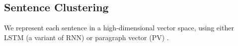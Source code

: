 \documentclass[10pt,final,conference,letterpaper]{IEEEtran}
\newcommand{\figref}[1]{Figure \ref{#1}}
\begin{document}
\subsection{Sentence Clustering}

%
%
%
We represent each sentence in a high-dimensional vector space,
using either LSTM (a variant of RNN) or paragraph vector (PV) \cite{le2014distributed}.
%
\end{document}
